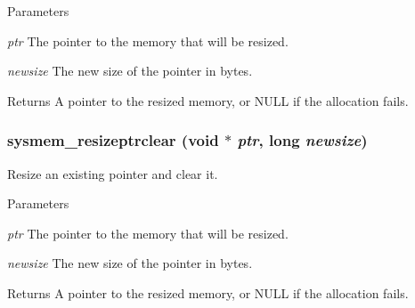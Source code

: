\begin{DoxyParams}{Parameters}
\item[{\em ptr}]The pointer to the memory that will be resized. \item[{\em newsize}]The new size of the pointer in bytes. \end{DoxyParams}
\begin{DoxyReturn}{Returns}
A pointer to the resized memory, or NULL if the allocation fails. 
\end{DoxyReturn}
\hypertarget{group__memory_gaf458ca679d665984dbaa8125c88a417e}{
\subsubsection[{sysmem\_\-resizeptrclear}]{ sysmem\_\-resizeptrclear (void $\ast$ {\em ptr}, \/  long {\em newsize})}}
\label{group__memory_gaf458ca679d665984dbaa8125c88a417e}


Resize an existing pointer and clear it. 
\begin{DoxyParams}{Parameters}
\item[{\em ptr}]The pointer to the memory that will be resized. \item[{\em newsize}]The new size of the pointer in bytes. \end{DoxyParams}
\begin{DoxyReturn}{Returns}
A pointer to the resized memory, or NULL if the allocation fails. 
\end{DoxyReturn}
